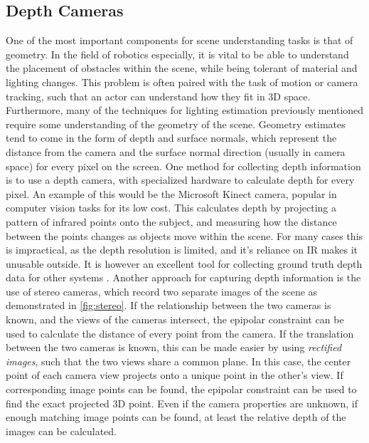 \documentclass[ %
                    author={Gavin Parker},
                supervisor={Dr. Neill Campbell},
                    degree={MEng},
                     title={Deep Learning for Illumination Estimation from Stereo Images},
                  subtitle={},
                      type={Research},
                      year={2018} ]{dissertation}
\begin{document}
\subsection{Depth Cameras}
One of the most important components for scene understanding tasks is that of geometry. In the field of robotics especially, it is vital to be able to understand the placement of obstacles within the scene, while being tolerant of material and lighting changes. This problem is often paired with the task of motion or camera tracking, such that an actor can understand how they fit in 3D space. Furthermore, many of the techniques for lighting estimation previously mentioned require some understanding of the geometry of the scene. Geometry estimates tend to come in the form of depth and surface normals, which represent the distance from the camera and the surface normal direction (usually in camera space) for every pixel on the screen.
\newline
One method for collecting depth information is to use a depth camera, with specialized hardware to calculate depth for every pixel. An example of this would be the Microsoft Kinect camera, popular in computer vision tasks for its low cost. This calculates depth by projecting a pattern of infrared points onto the subject, and measuring how the distance between the points changes as objects move within the scene. For many cases this is impractical, as the depth resolution is limited, and it's reliance on IR makes it unusable outside. It is however an excellent tool for collecting ground truth depth data for other systems \cite{Khoshelham_accuracyand}.
\newline
Another approach for capturing depth information is the use of stereo cameras, which record two separate images of the scene as demonstrated in \ref{fig:stereo}. If the relationship between the two cameras is known, and the views of the cameras intersect, the epipolar constraint can be used to calculate the distance of every point from the camera. If the translation between the two cameras is known, this can be made easier by using \textit{rectified images}, such that the two views share a common plane. In this case, the center point of each camera view projects onto a unique point in the other's view. If corresponding image points can be found, the epipolar constraint can be used to find the exact projected 3D point. Even if the camera properties are unknown, if enough matching image points can be found, at least the relative depth of the images can be calculated.
\end{document}
